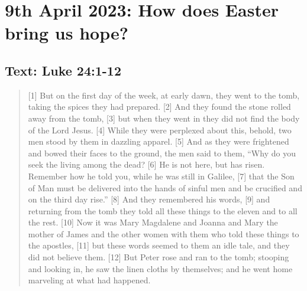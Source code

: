 \setcounter{figure}{0}

\section{9th April 2023: How does Easter bring us hope?}
\subsection*{Text: Luke 24:1-12}
  \begin{quote}
    [1] But on the first day of the week, at early dawn, they went to the tomb, taking the spices they had prepared. [2] And they found the stone rolled away from the tomb, [3] but when they went in they did not find the body of the Lord Jesus. [4] While they were perplexed about this, behold, two men stood by them in dazzling apparel. [5] And as they were frightened and bowed their faces to the ground, the men said to them, “Why do you seek the living among the dead? [6] He is not here, but has risen. Remember how he told you, while he was still in Galilee, [7] that the Son of Man must be delivered into the hands of sinful men and be crucified and on the third day rise.” [8] And they remembered his words, [9] and returning from the tomb they told all these things to the eleven and to all the rest. [10] Now it was Mary Magdalene and Joanna and Mary the mother of James and the other women with them who told these things to the apostles, [11] but these words seemed to them an idle tale, and they did not believe them. [12] But Peter rose and ran to the tomb; stooping and looking in, he saw the linen cloths by themselves; and he went home marveling at what had happened.
  \end{quote}
